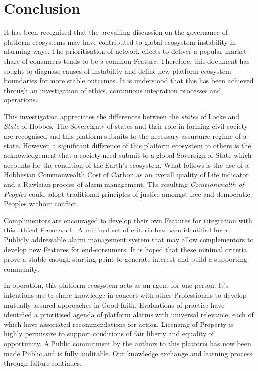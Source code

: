 \documentclass[11pt, oneside]{book}   	%
\begin{document}
\newpage
\thispagestyle{empty}
\mbox{}
\newpage

\chapter{Conclusion}
It has been recognised that the prevailing discussion on the governance of platform ecosystems may have contributed to global ecosystem instability in alarming ways.
The prioritisation of network effects to deliver a popular market share of consumers tends to be a common Feature.
Therefore, this document has sought to diagnose causes of instability and define new platform ecosystem boundaries for more stable outcomes.
It is understood that this has been achieved through an investigation of ethics, continuous integration processes and operations.\

This investigation appreciates the differences between the \emph{states} of Locke and \emph{State} of Hobbes.
The Sovereignty of states and their role in forming civil society are recognised and this platform submits to the necessary assurance regime of a state.
However, a significant difference of this platform ecosystem to others is the acknowledgement that a society need submit to a global Sovereign of State which accounts for the condition of the Earth's ecosystem.
What follows is the use of a Hobbesian Commonwealth Cost of Carbon as an overall quality of Life indicator and a Rawlsian process of alarm management.
The resulting \emph{Commonwealth of Peoples} could adopt traditional principles of justice amongst free and democratic Peoples without conflict.\

Complimentors are encouraged to develop their own Features for integration with this ethical Framework.
A minimal set of criteria has been identified for a Publicly addressable alarm management system that may allow complementors to develop new Features for end-consumers.
It is hoped that these minimal criteria prove a stable enough starting point to generate interest and build a supporting community.\

In operation, this platform ecosystem acts as an agent for one person.
It's intentions are to share knowledge in concert with other Professionals to develop mutually assured approaches in Good faith.
Evaluations of practice have identified a prioritised agenda of platform alarms with universal relevance, each of which have associated recommendations for action.
Licensing of Property is highly permissive to support conditions of fair liberty and equality of opportunity.
A Public commitment by the authors to this platform has now been made Public and is fully auditable.
Our knowledge exchange and learning process through failure continues.\
\end{document}
